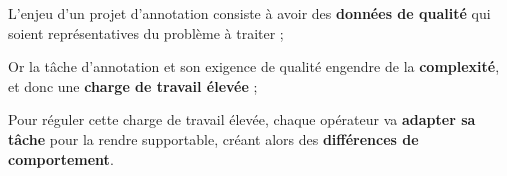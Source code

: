 	
	
	\begin{leftBarSummary}
		\begin{todolist}
			\item[\itemok] L'enjeu d'un projet d'annotation consiste à avoir des \textbf{données de qualité} qui soient représentatives du problème à traiter ;
			\item[\itemok] Or la tâche d'annotation et son exigence de qualité engendre de la \textbf{complexité}, et donc une \textbf{charge de travail élevée} ;
			\item[\itemok] Pour réguler cette charge de travail élevée, chaque opérateur va \textbf{adapter sa tâche} pour la rendre supportable, créant alors des \textbf{différences de comportement}.
		\end{todolist}
	\end{leftBarSummary}